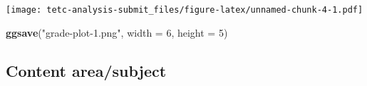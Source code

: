 \documentclass[]{article}
\newenvironment{Shaded}{\begin{snugshade}}{\end{snugshade}}
\newcommand{\KeywordTok}[1]{\textcolor[rgb]{0.13,0.29,0.53}{\textbf{#1}}}
\newcommand{\DataTypeTok}[1]{\textcolor[rgb]{0.13,0.29,0.53}{#1}}
\newcommand{\DecValTok}[1]{\textcolor[rgb]{0.00,0.00,0.81}{#1}}
\newcommand{\StringTok}[1]{\textcolor[rgb]{0.31,0.60,0.02}{#1}}
\newcommand{\OperatorTok}[1]{\textcolor[rgb]{0.81,0.36,0.00}{\textbf{#1}}}
\newcommand{\NormalTok}[1]{#1}
\begin{document}
\texttt{[image: tetc-analysis-submit\_files/figure-latex/unnamed-chunk-4-1.pdf]}

\begin{Shaded}
\begin{Highlighting}[]
\KeywordTok{ggsave}\NormalTok{(}\StringTok{"grade-plot-1.png"}\NormalTok{, }\DataTypeTok{width =} \DecValTok{6}\NormalTok{, }\DataTypeTok{height =} \DecValTok{5}\NormalTok{)}
\end{Highlighting}
\end{Shaded}

\subsection{Content area/subject}\label{content-areasubject}

\begin{Shaded}
\end{Shaded}
\end{document}
